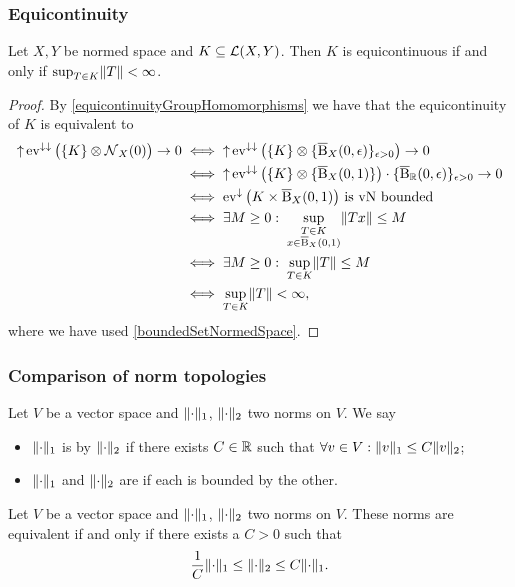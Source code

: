 \subsubsection{Equicontinuity}
\begin{proposition}
Let $X,Y$ be normed space and $K\subseteq \operatorname{\mathcal{L}}(X,Y)$. Then $K$ is equicontinuous \textup{if and only if} $\sup_{T\in K}\lVert T\rVert < \infty$.
\end{proposition}
\begin{proof}
By \ref{equicontinuityGroupHomomorphisms} we have that the equicontinuity of $K$ is equivalent to
\begin{align*}
\operatorname{\uparrow} \operatorname{ev}^{\downarrow\downarrow}\big(\{K\}\otimes \operatorname{\mathcal{N}}_{X}(0)\big) \to 0 &\iff \operatorname{\uparrow} \operatorname{ev}^{\downarrow\downarrow}\big(\{K\}\otimes \{\operatorname{\overline{B}}_X(0,\epsilon)\}_{\epsilon > 0}\big) \to 0 \\
&\iff \operatorname{\uparrow} \operatorname{ev}^{\downarrow\downarrow}\big(\{K\}\otimes \{\operatorname{\overline{B}}_X(0,1)\}\big)\cdot \{\operatorname{\overline{B}}_{\mathbb{R}}(0,\epsilon)\}_{\epsilon > 0} \to 0 \\
&\iff \text{$\operatorname{ev}^{\downarrow}\big(K\times \operatorname{\overline{B}}_X(0,1)\big)$ is vN bounded} \\
&\iff \exists M\geq 0: \; \sup_{\substack{T\in K \\ x\in \operatorname{\overline{B}}_X(0,1)}} \lVert Tx\rVert \leq M \\
&\iff \exists M\geq 0: \; \sup_{T\in K} \lVert T\rVert \leq M \\
&\iff \sup_{T\in K} \lVert T\rVert < \infty,
\end{align*}
where we have used \ref{boundedSetNormedSpace}.
\end{proof}


\subsubsection{Comparison of norm topologies}
\begin{definition}
Let $V$ be a vector space and $\lVert\cdot\rVert_1$, $\lVert\cdot\rVert_2$ two norms on $V$. We say
\begin{itemize}
\item $\lVert\cdot\rVert_1$ is  by $\lVert\cdot\rVert_2$ if there exists $C\in \mathbb{R}$ such that $\forall v\in V: \lVert v\rVert_1 \leq C\lVert v\rVert_2$;
\item $\lVert\cdot\rVert_1$ and $\lVert\cdot\rVert_2$ are  if each is bounded by the other.
\end{itemize}
\end{definition}

\begin{lemma}
Let $V$ be a vector space and $\lVert\cdot\rVert_1$, $\lVert\cdot\rVert_2$ two norms on $V$. These norms are equivalent \textup{if and only if} there exists a $C>0$ such that
\[ \frac{1}{C}\lVert\cdot\rVert_1 \leq \lVert\cdot\rVert_2 \leq C\lVert\cdot\rVert_1. \]
\end{lemma}

